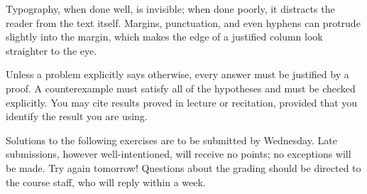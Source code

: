 \documentclass[12pt]{article}
\begin{document}
Typography, when done well, is invisible; when done poorly, it distracts
the reader from the text itself. Margins, punctuation, and even hyphens can
protrude slightly into the margin, which makes the edge of a justified column
look straighter to the eye.

Unless a problem explicitly says otherwise, every answer must be justified by
a proof. A counterexample must satisfy all of the hypotheses and must be
checked explicitly. You may cite results proved in lecture or recitation,
provided that you identify the result you are using.

Solutions to the following exercises are to be submitted by Wednesday. Late
submissions, however well-intentioned, will receive no points; no exceptions
will be made. Try again tomorrow! Questions about the grading should be
directed to the course staff, who will reply within a week.
\end{document}
